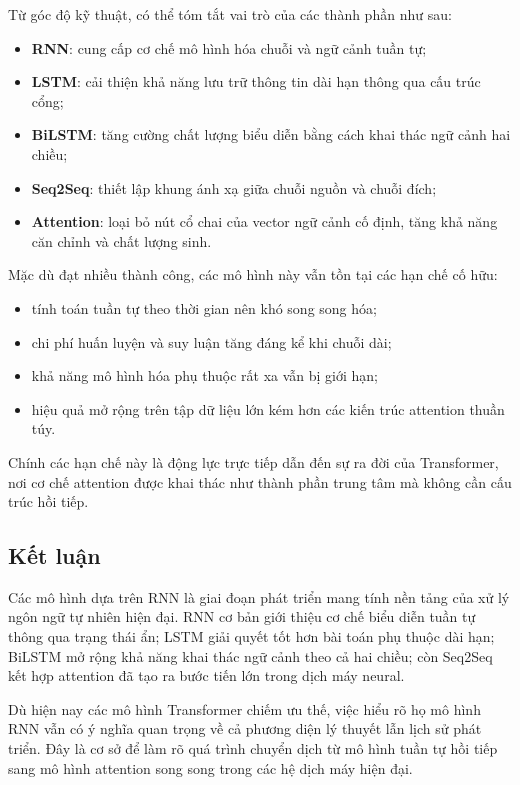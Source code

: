 \documentclass[a4paper,12pt,twoside]{report}
\begin{document}
Từ góc độ kỹ thuật, có thể tóm tắt vai trò của các thành phần như sau:
\begin{itemize}
    \item \textbf{RNN}: cung cấp cơ chế mô hình hóa chuỗi và ngữ cảnh tuần tự;
    \item \textbf{LSTM}: cải thiện khả năng lưu trữ thông tin dài hạn thông qua cấu trúc cổng;
    \item \textbf{BiLSTM}: tăng cường chất lượng biểu diễn bằng cách khai thác ngữ cảnh hai chiều;
    \item \textbf{Seq2Seq}: thiết lập khung ánh xạ giữa chuỗi nguồn và chuỗi đích;
    \item \textbf{Attention}: loại bỏ nút cổ chai của vector ngữ cảnh cố định, tăng khả năng căn chỉnh và chất lượng sinh.
\end{itemize}

Mặc dù đạt nhiều thành công, các mô hình này vẫn tồn tại các hạn chế cố hữu:
\begin{itemize}
    \item tính toán tuần tự theo thời gian nên khó song song hóa;
    \item chi phí huấn luyện và suy luận tăng đáng kể khi chuỗi dài;
    \item khả năng mô hình hóa phụ thuộc rất xa vẫn bị giới hạn;
    \item hiệu quả mở rộng trên tập dữ liệu lớn kém hơn các kiến trúc attention thuần túy.
\end{itemize}

Chính các hạn chế này là động lực trực tiếp dẫn đến sự ra đời của Transformer, nơi cơ chế attention được khai thác như thành phần trung tâm mà không cần cấu trúc hồi tiếp.

\subsection{Kết luận}

Các mô hình dựa trên RNN là giai đoạn phát triển mang tính nền tảng của xử lý ngôn ngữ tự nhiên hiện đại. RNN cơ bản giới thiệu cơ chế biểu diễn tuần tự thông qua trạng thái ẩn; LSTM giải quyết tốt hơn bài toán phụ thuộc dài hạn; BiLSTM mở rộng khả năng khai thác ngữ cảnh theo cả hai chiều; còn Seq2Seq kết hợp attention đã tạo ra bước tiến lớn trong dịch máy neural.

Dù hiện nay các mô hình Transformer chiếm ưu thế, việc hiểu rõ họ mô hình RNN vẫn có ý nghĩa quan trọng về cả phương diện lý thuyết lẫn lịch sử phát triển. Đây là cơ sở để làm rõ quá trình chuyển dịch từ mô hình tuần tự hồi tiếp sang mô hình attention song song trong các hệ dịch máy hiện đại.
\end{document}
